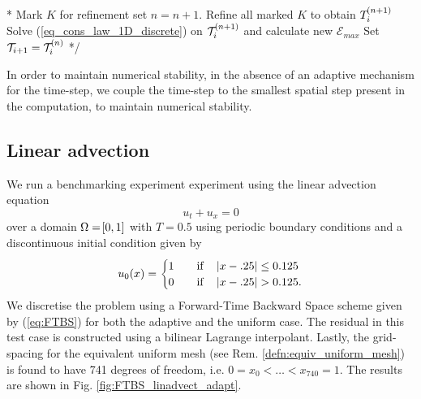 \documentclass[final]{amsart}
\numberwithin{equation}{section}
\begin{document}
\/*
\State Mark $K$ for refinement
\EndIf
\EndFor
\State set $n=n+1$.
\State Refine all marked $K$ to obtain $T_i^{\!\left({n+1}\right)}$
\State Solve (\ref{eq_cons_law_1D_discrete}) on $\mathcal{T}_i^{\!\left({n+1}\right)}$ and calculate new $\mathcal{E}_{max}$
\EndWhile
\State Set $\mathcal{T}_{i+1}=\mathcal{T}_i^{\!\left({n}\right)}$
*/


\begin{Rem}  In order to maintain numerical stability, in the absence of an adaptive mechanism for the time-step, we  couple the time-step to the smallest spatial step present in the computation, to maintain numerical stability.
\end{Rem}

\subsection{Linear advection}
We run a benchmarking experiment experiment using the linear advection equation
\begin{equation}
u_t+u_x=0
\end{equation}
over a domain $\Omega = \!\left[{0,1}\right]$ with $T=0.5$ using periodic boundary conditions and a discontinuous initial condition given by
\begin{equation}\label{eq_ic_step}
u_0\qp{x}=\begin{cases}
1\quad&\text{if}\quad \norm{x-.25}\leq 0 .125\\
0\quad&\text{if} \quad \norm{x-.25}>  0.125.
\end{cases}
\end{equation}
We discretise the problem using a Forward-Time Backward Space scheme given by (\ref{eq:FTBS}) for both the adaptive and the uniform case. The residual in this test case is constructed using a bilinear Lagrange interpolant.  Lastly, the grid-spacing for the equivalent uniform mesh (see Rem. \ref{defn:equiv_uniform_mesh}) is found to have 741 degrees of freedom, i.e. $0=x_0<\dots<x_{740}=1$.  The results are shown in Fig. \ref{fig:FTBS_linadvect_adapt}.
\end{document}
